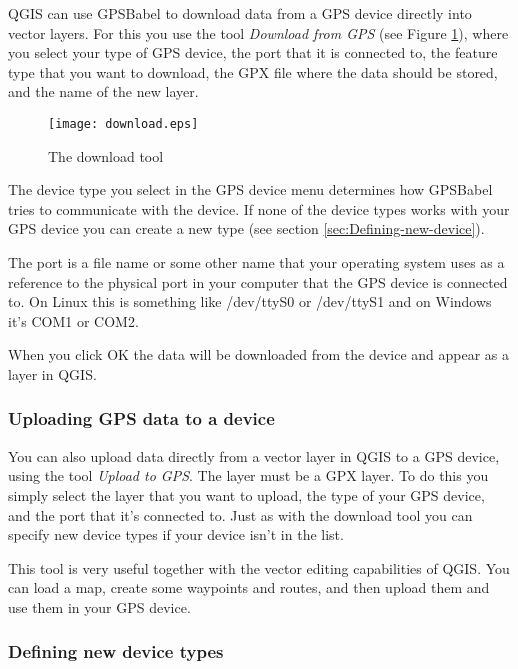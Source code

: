 QGIS can use GPSBabel to download data from a GPS device directly
into vector layers. For this you use the tool \emph{Download from
GPS} (see Figure \ref{figure_download}), where you select your type
of GPS device, the port that it is connected to, the feature type
that you want to download, the GPX file where the data should be stored,
and the name of the new layer.

\begin{figure}[ht]
   \begin{center}
\caption{\label{figure_download}The download tool}
\texttt{[image: download.eps]}
   \end{center}
\end{figure}


The device type you select in the GPS device menu determines how GPSBabel
tries to communicate with the device. If none of the device types
works with your GPS device you can create a new type (see section
\ref{sec:Defining-new-device}).

The port is a file name or some other name that your operating system
uses as a reference to the physical port in your computer that the
GPS device is connected to. On Linux this is something like /dev/ttyS0
or /dev/ttyS1 and on Windows it's COM1 or COM2.

When you click OK the data will be downloaded from the device and
appear as a layer in QGIS.

\subsubsection{Uploading GPS data to a device}

You can also upload data directly from a vector layer in QGIS to a
GPS device, using the tool \emph{Upload to GPS}. The layer must be
a GPX layer. To do this you simply select the layer that you want
to upload, the type of your GPS device, and the port that it's connected
to. Just as with the download tool you can specify new device types
if your device isn't in the list.

This tool is very useful together with the vector editing capabilities
of QGIS. You can load a map, create some waypoints and routes, and
then upload them and use them in your GPS device.

\subsubsection{\label{sec:Defining-new-device}Defining new device types}

